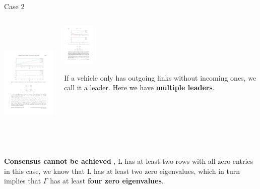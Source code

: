 \begin{frame}{Case 2}

\begin{columns}
 \begin{column}{.70\textwidth}
	\begin{center}
		\includegraphics[height=6cm]{images/StatesCase2.pdf}
	\end{center}
	\vskip 0.3cm
 \end{column}
 \begin{column}{.30\textwidth}
 	\vskip 0.3cm
	\begin{center}
		\includegraphics[height=2cm]{images/GraphCase2.pdf}
	\end{center}
	If a vehicle only has outgoing links without incoming ones, we call it a leader.
	Here we have {\textcolor{green!40!black}{\fontsize{13}{15}\textbf{multiple leaders}}}.
 \end{column}
\end{columns}
{\textcolor{green!40!black}{\fontsize{13}{15}\textbf{Consensus cannot be achieved}}} ,  
L has at least two rows with all zero entries in this case, we know that  L has at least two zero eigenvalues, 
which in turn implies that $\Gamma$ 
has at least {\textcolor{green!40!black}{\fontsize{13}{15}\textbf{four zero eigenvalues}}}.
\vskip 0.3cm

\end{frame}

